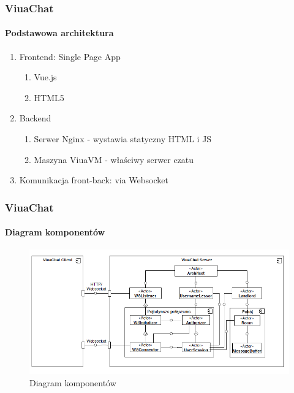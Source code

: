 \documentclass{beamer}
\begin{document}
\begin{frame}
    \frametitle{ViuaChat}
    \framesubtitle{Podstawowa architektura}

    \begin{enumerate}
        \item Frontend: Single Page App
        \begin{enumerate}
        	\item Vue.js
        	\item HTML5
        \end{enumerate}
        \item Backend
        \begin{enumerate}
        	\item Serwer Nginx - wystawia statyczny HTML i JS
        	\item Maszyna ViuaVM - właściwy serwer czatu
        \end{enumerate}
        \item Komunikacja front-back: via Websocket
    \end{enumerate}
\end{frame}

\begin{frame}
    \frametitle{ViuaChat}
    \framesubtitle{Diagram komponentów}
	\begin{figure}[!htp]
		\centering
		\includegraphics[width=\textwidth]{pckdiag}
		\caption{Diagram komponentów}
		\label{diagram_komponentow}
	\end{figure}
\end{frame}
\end{document}
